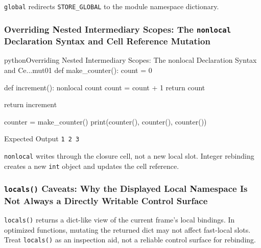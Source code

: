 \texttt{global} redirects \texttt{STORE\_GLOBAL} to the module namespace dictionary.

\subsubsection{Overriding Nested Intermediary Scopes: The \texttt{nonlocal} Declaration Syntax and Cell Reference Mutation}

\begin{codebox}[]{python}{Overriding Nested Intermediary Scopes: The nonlocal Declaration Syntax and Ce...}{mut01}
def make_counter():
    count = 0

    def increment():
        nonlocal count
        count = count + 1
        return count

    return increment

counter = make_counter()
print(counter(), counter(), counter())
\end{codebox}


\begin{iobox}{Expected Output}
\texttt{1 2 3} \\
\end{iobox}




\texttt{nonlocal} writes through the closure cell, not a new local slot. Integer rebinding creates a new \texttt{int} object and updates the cell reference.

\subsubsection{\texttt{locals()} Caveats: Why the Displayed Local Namespace Is Not Always a Directly Writable Control Surface}

\texttt{locals()} returns a dict-like view of the current frame's local bindings. In optimized functions, mutating the returned dict may not affect fast-local slots. Treat \texttt{locals()} as an inspection aid, not a reliable control surface for rebinding.
